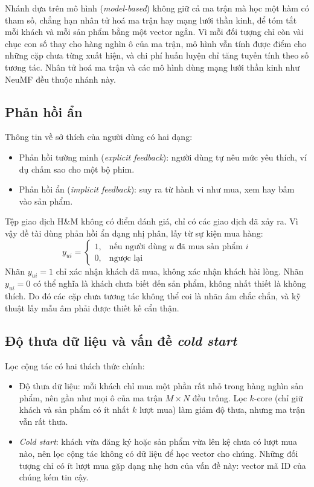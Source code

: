 Nhánh dựa trên mô hình (\textit{model-based}) không giữ cả ma trận mà học một hàm có tham số, chẳng hạn nhân tử hoá ma trận hay mạng lưới thần kinh, để tóm tắt mỗi khách và mỗi sản phẩm bằng một vector ngắn. Vì mỗi đối tượng chỉ còn vài chục con số thay cho hàng nghìn ô của ma trận, mô hình vẫn tính được điểm cho những cặp chưa từng xuất hiện, và chi phí huấn luyện chỉ tăng tuyến tính theo số tương tác. Nhân tử hoá ma trận và các mô hình dùng mạng lưới thần kinh như NeuMF đều thuộc nhánh này.

\subsection{Phản hồi ẩn}
\label{subsec:feedback_types}

Thông tin về sở thích của người dùng có hai dạng:
\begin{itemize}
    \item Phản hồi tường minh (\textit{explicit feedback}): người dùng tự nêu mức yêu thích, ví dụ chấm sao cho một bộ phim.
    \item Phản hồi ẩn (\textit{implicit feedback}): suy ra từ hành vi như mua, xem hay bấm vào sản phẩm.
\end{itemize}

Tệp giao dịch H\&M không có điểm đánh giá, chỉ có các giao dịch đã xảy ra. Vì vậy đề tài dùng phản hồi ẩn dạng nhị phân, lấy từ sự kiện mua hàng:
\begin{equation*}
    y_{ui} = \begin{cases}
        1, & \text{nếu người dùng } u \text{ đã mua sản phẩm } i \\
        0, & \text{ngược lại}
    \end{cases}
\end{equation*}
Nhãn $y_{ui} = 1$ chỉ xác nhận khách đã mua, không xác nhận khách hài lòng. Nhãn $y_{ui} = 0$ có thể nghĩa là khách chưa biết đến sản phẩm, không nhất thiết là không thích. Do đó các cặp chưa tương tác không thể coi là nhãn âm chắc chắn, và kỹ thuật lấy mẫu âm phải được thiết kế cẩn thận.

\subsection{Độ thưa dữ liệu và vấn đề \textit{cold start}}
\label{subsec:thachthuc_sparsity}

Lọc cộng tác có hai thách thức chính:
\begin{itemize}
    \item Độ thưa dữ liệu: mỗi khách chỉ mua một phần rất nhỏ trong hàng nghìn sản phẩm, nên gần như mọi ô của ma trận $M \times N$ đều trống. Lọc $k$-core (chỉ giữ khách và sản phẩm có ít nhất $k$ lượt mua) làm giảm độ thưa, nhưng ma trận vẫn rất thưa.
    \item \textit{Cold start}: khách vừa đăng ký hoặc sản phẩm vừa lên kệ chưa có lượt mua nào, nên lọc cộng tác không có dữ liệu để học vector cho chúng. Những đối tượng chỉ có ít lượt mua gặp dạng nhẹ hơn của vấn đề này: vector mã ID của chúng kém tin cậy.
\end{itemize}

